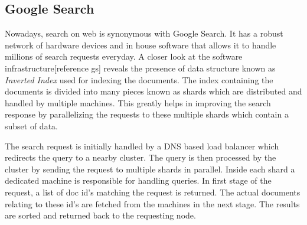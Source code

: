 \documentclass[a4paper, 11pt]{article}
\begin{document}
\subsection*{Google Search}
Nowadays, search on web is synonymous with Google Search. It has a robust network of hardware devices and in house software that allows it to handle millions of search requests everyday. A closer look at the software infrastructure[reference gs] reveals the presence of data structure known as \textit{Inverted Index} used for indexing the documents. The index containing the documents is divided into many pieces known as shards which are distributed and handled by multiple machines. This greatly helps in improving the search response by parallelizing the requests to these multiple shards which contain a subset of data. 
\par The search request is initially handled by a DNS based load balancer which redirects the query to a nearby cluster. The query is then processed by the cluster by sending the request to multiple shards in parallel. Inside each shard a dedicated machine is responsible for handling queries. In first stage of the request, a list of doc id's matching the request is returned. The actual documents relating to these id's are fetched from the machines in the next stage. The results are sorted and returned back to the requesting node.
\end{document}

